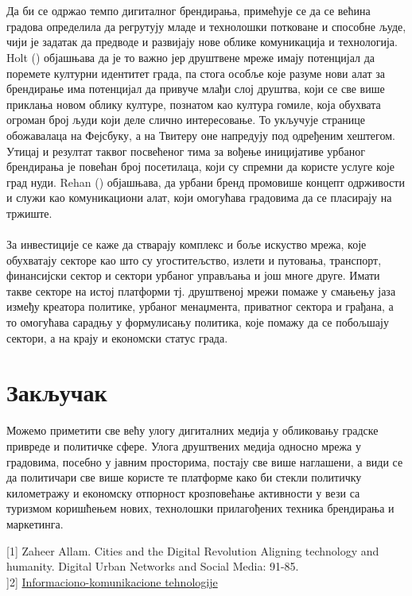 \documentclass{article}
\begin{document}
\\\\
Да би се одржао темпо дигиталног брендирања, примећује се да се већина градова определила да регрутују младе и технолошки потковане и способне људе, чији је задатак да предводе и развијају нове облике комуникација и технологија. Holt (\cite{ho_2016}) објашњава да је то важно јер друштвене мреже имају потенцијал да поремете културни идентитет града, па стога особље које разуме нови алат за брендирање има потенцијал да привуче млађи слој друштва, који се све више приклања новом облику културе, познатом као култура гомиле, која обухвата огроман број људи који деле слично интересовање. То укључује странице обожавалаца на Фејсбуку, а на Твитеру оне напредују под одређеним хештегом. Утицај и резултат таквог посвећеног тима за вођење иницијативе урбаног брендирања је повећан број посетилаца, који су спремни да користе услуге које град нуди. Rehan (\cite{re_2014}) објашњава, да урбани бренд промовише концепт одрживости и служи као комуникациони алат, који омогућава градовима да се пласирају на тржиште. 
\\\\
За инвестиције се каже да стварају комплекс и боље искуство мрежа, које обухватају секторе као што су угоститељство, излети и путовања, транспорт, финансијски сектор и сектори урбаног управљања и још многе друге. Имати такве секторе на истој платформи тј. друштвеној мрежи помаже у смањењу јаза између креатора политике, урбаног менаџмента, приватног сектора и грађана, а то омогућава сарадњу у формулисању политика, које помажу да се побољшају сектори, а на крају и економски статус града.

\section{Закључак}
Можемо приметити све већу улогу дигиталних медија у
обликовању градске привреде и политичке сфере. Улога друштвених медија односно мрежа у градовима, посебно у јавним просторима, постају све више наглашени, а види се да политичари све више користе те платформе како би стекли политичку километражу и економску отпорност крозповећање активности у вези са туризмом коришћењем нових, технолошки прилагођених техника брендирања и маркетинга.

\newpage

 
[1] Zaheer Allam.    Cities and the  Digital  Revolution Aligning technology and humanity. Digital Urban Networks and Social Media: 91-85. \\ 
]2] \href{http://miticmirjana.weebly.com/104810501058-10901077109310851086108310861075108011121077.html}{Informaciono-komunikacione tehnologije}
\end{document}
